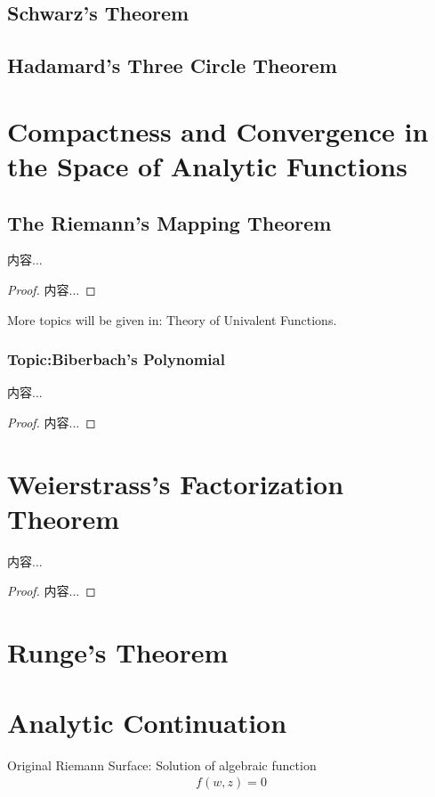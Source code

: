 \documentclass[Total.tex]{subfiles}
\begin{document}
			\subsection{Schwarz's Theorem}
			\subsection{Hadamard's Three Circle Theorem}
			
		\section{Compactness and Convergence in the Space of Analytic Functions}
			\subsection{The Riemann's Mapping Theorem}
				\begin{theorem}
					内容...
				\end{theorem}
				\begin{proof}
					内容...
				\end{proof}
				
				More topics will be given in: Theory of Univalent Functions.
				\subsubsection{Topic:Biberbach's Polynomial}
				\begin{lemma}
					内容...
				\end{lemma}
				\begin{proof}
					内容...
				\end{proof} 
			\section{Weierstrass's Factorization Theorem}
				\begin{theorem}
					内容...
				\end{theorem}
				\begin{proof}
					内容...
				\end{proof}
		\section{Runge's Theorem}
		\section{Analytic Continuation}
			Original Riemann Surface: Solution of algebraic function
			\begin{gather*}
				f(w,z)=0
			\end{gather*}
			
\end{document}
